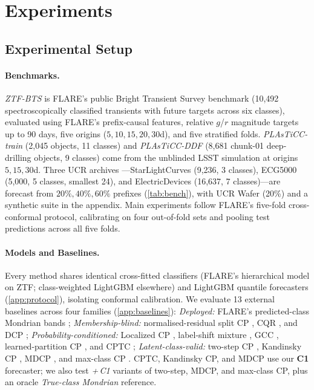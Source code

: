 \section{Experiments}
\label{sec:exp}

\subsection{Experimental Setup}
\paragraph{Benchmarks.}
\emph{ZTF-BTS} is FLARE's public Bright Transient Survey benchmark \citep{fremling2020bts,perley2020bts,sasli2026forecast,sasli2026flare} (10,492 spectroscopically classified transients with future targets across six classes), evaluated using FLARE's prefix-causal features, relative $g$/$r$ magnitude targets up to 90 days, five origins ($5,10,15,20,30$d), and five stratified folds.
\emph{PLAsTiCC-train} (2,045 objects, 11 classes) and \emph{PLAsTiCC-DDF} (8,681 chunk-01 deep-drilling objects, 9 classes) come from the unblinded LSST simulation \citep{kessler2019models,hlozek2023results} at origins $5,15,30$d.
Three UCR archives \citep{dau2019ucr}---StarLightCurves (9,236, 3 classes), ECG5000 (5,000, 5 classes, smallest 24), and ElectricDevices (16,637, 7 classes)---are forecast from $20\%,40\%,60\%$ prefixes (\cref{tab:bench}), with UCR Wafer (20\%) and a synthetic suite in the appendix.
Main experiments follow FLARE's five-fold cross-conformal protocol, calibrating on four out-of-fold sets and pooling test predictions across all five folds.

\paragraph{Models and Baselines.}
Every method shares identical cross-fitted classifiers (FLARE's hierarchical model on ZTF; class-weighted LightGBM elsewhere) and LightGBM quantile forecasters \citep{ke2017lightgbm} (\cref{app:protocol}), isolating conformal calibration.
We evaluate 13 external baselines across four families (\cref{app:baselines}):
\emph{Deployed:} FLARE's predicted-class Mondrian bands \citep{sasli2026forecast,sasli2026flare};
\emph{Membership-blind:} normalised-residual split CP \citep{lei2018distribution}, CQR \citep{romano2019conformalized}, and DCP \citep{chernozhukov2021distributional};
\emph{Probability-conditioned:} Localized CP \citep{guan2023localized}, label-shift mixture \citep{podkopaev2021distribution}, GCC \citep{gibbs2025conformal}, learned-partition CP \citep{kiyani2024conformal}, and CPTC \citep{sun2025conformal};
\emph{Latent-class-valid:} two-step CP \citep{timans2024adaptive}, Kandinsky CP \citep{bairaktari2025kandinsky}, MDCP \citep{yang2026multi}, and max-class CP \citep{barber2021limits}.
CPTC, Kandinsky CP, and MDCP use our \textbf{C1} forecaster; we also test \emph{+\,C1} variants of two-step, MDCP, and max-class CP, plus an oracle \emph{True-class Mondrian} reference.

